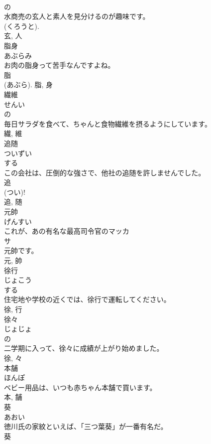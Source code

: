\documentclass[8pt]{extreport}
\begin{document}
\begin{CJK}{UTF8}{min}
\\	の 
\\	水商売の玄人と素人を見分けるのが趣味です。	
\\	(くろうと). 
\\	玄, 人	
\\	脂身	
\\	あぶらみ	
\\	お肉の脂身って苦手なんですよね。	
\\	脂 
\\	(あぶら).	脂, 身	
\\	繊維	
\\	せんい	
\\	の 
\\	毎日サラダを食べて、ちゃんと食物繊維を摂るようにしています。	
\\	繊, 維	
\\	追随	
\\	ついずい	
\\	する 
\\	この会社は、圧倒的な強さで、他社の追随を許しませんでした。	
\\	追 
\\	(つい)! 
\\	追, 随	
\\	元帥	
\\	げんすい	
\\	これが、あの有名な最高司令官のマッカ
\\	サ
\\	元帥です。	
\\	元, 帥	
\\	徐行	
\\	じょこう	
\\	する 
\\	住宅地や学校の近くでは、徐行で運転してください。	
\\	徐, 行	
\\	徐々	
\\	じょじょ	
\\	の 
\\	二学期に入って、徐々に成績が上がり始めました。	
\\	徐, 々	
\\	本舗	
\\	ほんぽ	
\\	ベビー用品は、いつも赤ちゃん本舗で買います。	
\\	本, 舗	
\\	葵	
\\	あおい	
\\	徳川氏の家紋といえば、「三つ葉葵」が一番有名だ。	
\\	葵	

\end{CJK}
\end{document}
